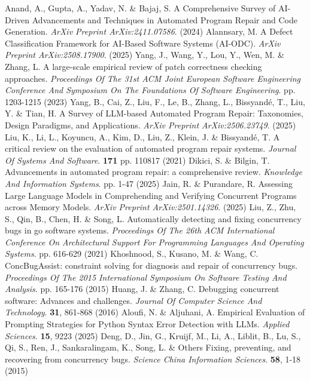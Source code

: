\begin{thebibliography}{20} 
Anand, A., Gupta, A., Yadav, N. \& Bajaj, S. A Comprehensive Survey of AI-Driven Advancements and Techniques in Automated Program Repair and Code Generation. {\em ArXiv Preprint ArXiv:2411.07586}. (2024)
Alannsary, M. A Defect Classification Framework for AI-Based Software Systems (AI-ODC). {\em ArXiv Preprint ArXiv:2508.17900}. (2025)
Yang, J., Wang, Y., Lou, Y., Wen, M. \& Zhang, L. A large-scale empirical review of patch correctness checking approaches. {\em Proceedings Of The 31st ACM Joint European Software Engineering Conference And Symposium On The Foundations Of Software Engineering}. pp. 1203-1215 (2023)
Yang, B., Cai, Z., Liu, F., Le, B., Zhang, L., Bissyandé, T., Liu, Y. \& Tian, H. A Survey of LLM-based Automated Program Repair: Taxonomies, Design Paradigms, and Applications. {\em ArXiv Preprint ArXiv:2506.23749}. (2025)
Liu, K., Li, L., Koyuncu, A., Kim, D., Liu, Z., Klein, J. \& Bissyandé, T. A critical review on the evaluation of automated program repair systems. {\em Journal Of Systems And Software}. \textbf{171} pp. 110817 (2021)
Dikici, S. \& Bilgin, T. Advancements in automated program repair: a comprehensive review. {\em Knowledge And Information Systems}. pp. 1-47 (2025)
Jain, R. \& Purandare, R. Assessing Large Language Models in Comprehending and Verifying Concurrent Programs across Memory Models. {\em ArXiv Preprint ArXiv:2501.14326}. (2025)
Liu, Z., Zhu, S., Qin, B., Chen, H. \& Song, L. Automatically detecting and fixing concurrency bugs in go software systems. {\em Proceedings Of The 26th ACM International Conference On Architectural Support For Programming Languages And Operating Systems}. pp. 616-629 (2021)
Khoshnood, S., Kusano, M. \& Wang, C. ConcBugAssist: constraint solving for diagnosis and repair of concurrency bugs. {\em Proceedings Of The 2015 International Symposium On Software Testing And Analysis}. pp. 165-176 (2015)
Huang, J. \& Zhang, C. Debugging concurrent software: Advances and challenges. {\em Journal Of Computer Science And Technology}. \textbf{31}, 861-868 (2016)
Aloufi, N. \& Aljuhani, A. Empirical Evaluation of Prompting Strategies for Python Syntax Error Detection with LLMs. {\em Applied Sciences}. \textbf{15}, 9223 (2025)
Deng, D., Jin, G., Kruijf, M., Li, A., Liblit, B., Lu, S., Qi, S., Ren, J., Sankaralingam, K., Song, L. \& Others Fixing, preventing, and recovering from concurrency bugs. {\em Science China Information Sciences}. \textbf{58}, 1-18 (2015)

\end{thebibliography}
